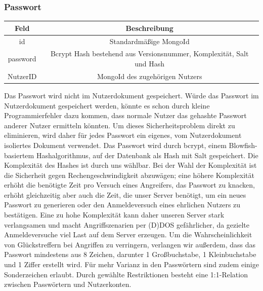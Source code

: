 \subsubsection{Passwort}
\begin{center}
    \begin{tabular}{ |c|c| }
        \hline
        Feld & Beschreibung  \\
        \hline
        id & Standardmäßige MongoId \\
        password & Bcrypt Hash bestehend aus Versionsnummer, Komplexität, Salt und Hash \\
        NutzerID & MongoId des zugehörigen Nutzers \\
        \hline
    \end{tabular}
    \cite{DB3} \cite{DB4}
\end{center}

Das Passwort wird nicht im Nutzerdokument gespeichert. Würde das Passwort im Nutzerdokument gespeichert werden, könnte es schon durch kleine Programmierfehler dazu kommen, dass normale Nutzer das gehashte Passwort anderer Nutzer ermitteln könnten. Um dieses Sicherheitsproblem direkt zu eliminieren, wird daher für jedes Passwort ein eigenes, vom Nutzerdokument isoliertes Dokument verwendet.
Das Passwort wird durch bcrypt, einem Blowfish-basiertem Hashalgorithmus, auf der Datenbank als Hash mit Salt gespeichert. Die Komplexität des Hashes ist durch uns wählbar. Bei der Wahl der Komplexität ist die Sicherheit gegen Rechengeschwindigkeit abzuwägen; eine höhere Komplexität erhöht die benötigte Zeit pro Versuch eines Angreifers, das Passwort zu knacken, erhöht gleichzeitig aber auch die Zeit, die unser Server benötigt, um ein neues Passwort zu generieren oder den Anmeldeversuch eines ehrlichen Nutzers zu bestätigen. Eine zu hohe Komplexität kann daher unseren Server stark verlangsamen und macht Angriffszenarien per (D)DOS gefährlicher, da gezielte Anmeldeversuche viel Last auf dem Server erzeugen.
Um die Wahrscheinlichkeit von Glückstreffern bei Angriffen zu verringern, verlangen wir außerdem, dass das Passwort mindestens aus 8 Zeichen, darunter 1 Großbuchstabe, 1 Kleinbuchstabe und 1 Ziffer erstellt wird. Für mehr Varianz in den Passwörtern sind zudem einige Sonderzeichen erlaubt.
Durch gewählte Restriktionen besteht eine 1:1-Relation zwischen Passwörtern und Nutzerkonten.

